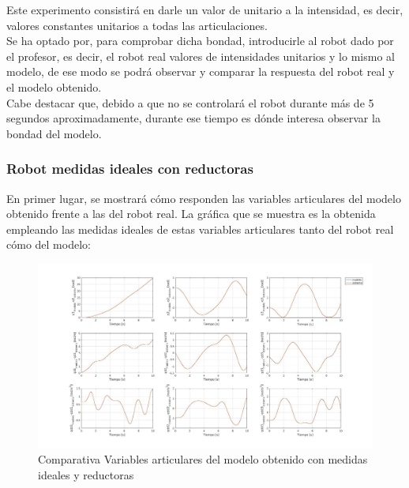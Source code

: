 Este experimento consistirá en darle un valor de unitario a la intensidad, es decir, valores constantes unitarios a todas las articulaciones. \\

Se ha optado por, para comprobar dicha bondad, introducirle al robot dado por el profesor, es decir, el robot real valores de intensidades unitarios y lo mismo al modelo, de ese modo se podrá observar y comparar la respuesta del robot real y el modelo obtenido.\\



Cabe destacar que, debido a que no se controlará el robot durante más de 5 segundos aproximadamente, durante ese tiempo es dónde interesa observar la bondad del modelo.

\subsubsection{Robot medidas ideales con reductoras}

En primer lugar, se mostrará cómo responden las variables articulares del modelo obtenido frente a las del robot real. La gráfica que se muestra es la obtenida empleando las medidas ideales de estas variables articulares tanto del robot real cómo del modelo:



\begin{figure}[h!]

	\centering

	\includegraphics[width=1\textwidth]{EstimacParam_SisMod_In1_IdealCR}

	\caption{Comparativa Variables articulares del modelo obtenido con medidas ideales y reductoras}

\end{figure}



